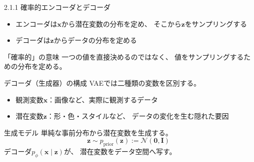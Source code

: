 \begin{frame}{2.1.1 確率的エンコーダとデコーダ}
    \centering
    \vspace{0.8em}
    \begin{itemize}
        \item エンコーダは$\boldsymbol{x}$から潜在変数の分布を定め、
        そこから$\boldsymbol{z}$をサンプリングする
        \item デコーダは$\boldsymbol{z}$からデータの分布を定める
    \end{itemize}
    \begin{exampleblock}{「確率的」の意味}
        一つの値を直接決めるのではなく、
        値をサンプリングするための分布を定める。
    \end{exampleblock}
\end{frame}
\begin{frame}{デコーダ（生成器）の構成}
    VAEでは二種類の変数を区別する。
    \begin{itemize}
        \item 観測変数$\boldsymbol{x}$：画像など、実際に観測するデータ
        \item 潜在変数$\boldsymbol{z}$：形・色・スタイルなど、
        データの変化を生む隠れた要因
    \end{itemize}
    \begin{block}{生成モデル}
        単純な事前分布から潜在変数を生成する。
        \[
            \boldsymbol{z}\sim p_{\mathrm{prior}}(\boldsymbol{z})
            :=\mathcal{N}(\boldsymbol{0},\mathbf{I})
        \]
        デコーダ$p_\phi(\boldsymbol{x}\mid\boldsymbol{z})$が、
        潜在変数をデータ空間へ写す。
    \end{block}
\end{frame}
